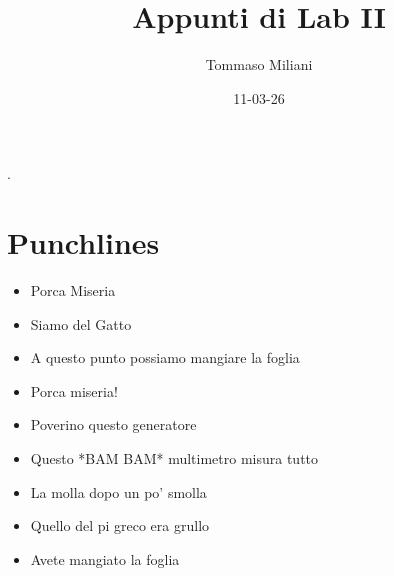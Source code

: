 \documentclass[a4paper, oneside]{article}
\title{Appunti di Lab II}
\author{Tommaso Miliani}
\date{11-03-26}
\begin{document}
                {}          %
                {}          %
                {\slshape}  %
                {}          %
                {\bfseries} %
                {.}         %
                {\newline}  %
                {}          %
\theoremstyle{theoremEnv}

\newtheorem{definition}{Definizione}[section]
\newtheorem{theorem}{Teorema}[section]
\newtheorem{lemma}{Proposizione}[section]
\newtheorem{observation}{Osservazione}[section]
\newtheorem{corollary}{Corollario}[theorem]
\newtheorem{example}{Esempio}[section]
\newtheorem{remark}{Enunciato}[section]

\maketitle

\section{Punchlines}
\begin{itemize}
    \item Porca Miseria
    \item Siamo del Gatto
    \item A questo punto possiamo mangiare la foglia
    \item Porca miseria!
    \item Poverino questo generatore
    \item Questo *BAM BAM* multimetro misura tutto
    \item La molla dopo un po' smolla
    \item Quello del pi greco era grullo
    \item Avete mangiato la foglia
\end{itemize}
\end{document}
